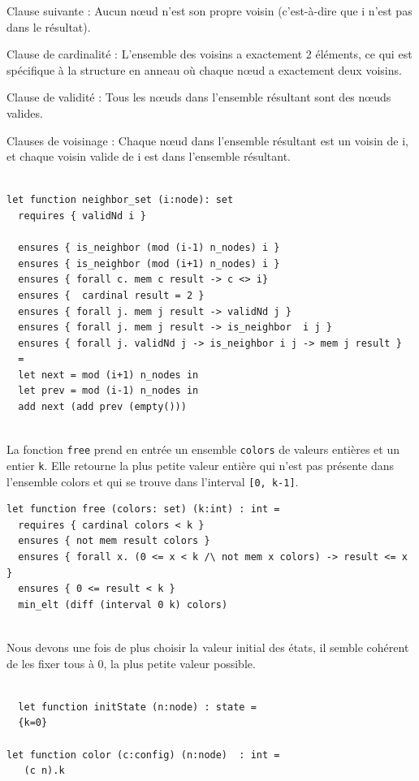 \documentclass[11pt]{article}
\begin{document}
Clause suivante : Aucun nœud n'est son propre voisin (c'est-à-dire que i n'est pas dans le résultat).

Clause de cardinalité : L'ensemble des voisins a exactement 2 éléments, ce qui est spécifique à la structure en anneau où chaque nœud a exactement deux voisins.

Clause de validité : Tous les nœuds dans l'ensemble résultant sont des nœuds valides.

Clauses de voisinage : Chaque nœud dans l'ensemble résultant est un voisin de i, et chaque voisin valide de i est dans l'ensemble résultant.

\lstset{language=why3,label= ,caption= ,captionpos=b,numbers=none}
\begin{lstlisting}

let function neighbor_set (i:node): set
  requires { validNd i }

  ensures { is_neighbor (mod (i-1) n_nodes) i } 
  ensures { is_neighbor (mod (i+1) n_nodes) i } 
  ensures { forall c. mem c result -> c <> i} 
  ensures {  cardinal result = 2 } 
  ensures { forall j. mem j result -> validNd j }
  ensures { forall j. mem j result -> is_neighbor  i j }
  ensures { forall j. validNd j -> is_neighbor i j -> mem j result }
  =
  let next = mod (i+1) n_nodes in
  let prev = mod (i-1) n_nodes in
  add next (add prev (empty()))


\end{lstlisting}

La fonction \texttt{free} prend en entrée un ensemble \texttt{colors} de valeurs entières et un entier \texttt{k}. 
Elle retourne la plus petite valeur entière qui n'est pas présente dans l'ensemble colors et qui se trouve dans l'interval \texttt{[0, k-1]}.

\lstset{language=why3,label= ,caption= ,captionpos=b,numbers=none}
\begin{lstlisting}
let function free (colors: set) (k:int) : int =
  requires { cardinal colors < k }
  ensures { not mem result colors }
  ensures { forall x. (0 <= x < k /\ not mem x colors) -> result <= x }
  ensures { 0 <= result < k }
  min_elt (diff (interval 0 k) colors)


\end{lstlisting}

Nous devons une fois de plus choisir la valeur initial des états, il semble cohérent de les fixer tous à 0, la plus petite valeur possible.

\lstset{language=why3,label= ,caption= ,captionpos=b,numbers=none}
\begin{lstlisting}

  let function initState (n:node) : state =
  {k=0}

let function color (c:config) (n:node)  : int =
   (c n).k

\end{lstlisting}
\end{document}
